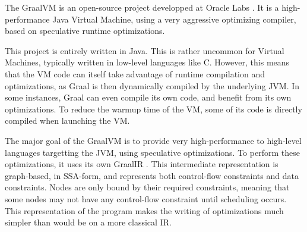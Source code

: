 \documentclass[twoside,11pt,a4paper]{article}
\begin{document}

The GraalVM is an open-source project developped at Oracle Labs \cite{graalpage}. It is a high-performance Java Virtual Machine, using a very aggressive optimizing compiler, based on speculative runtime optimizations.


This project is entirely written in Java. This is rather uncommon for Virtual Machines, typically written in low-level languages like C. However, this means that the VM code can itself take advantage of runtime compilation and optimizations, as Graal is then dynamically compiled by the underlying JVM. In some instances, Graal can even compile its own code, and benefit from its own optimizations. To reduce the warmup time of the VM, some of its code is directly compiled when launching the VM.


The major goal of the GraalVM is to provide very high-performance to high-level languages targetting the JVM, using speculative optimizations. To perform these optimizations, it uses its own GraalIR \cite{graalir, graalspecoptir}. This intermediate representation is graph-based, in SSA-form, and represents both control-flow constraints and data constraints. Nodes are only bound by their required constraints, meaning that some nodes may not have any control-flow constraint until scheduling occurs. This representation of the program makes the writing of optimizations much simpler than would be on a more classical IR.


\end{document}
